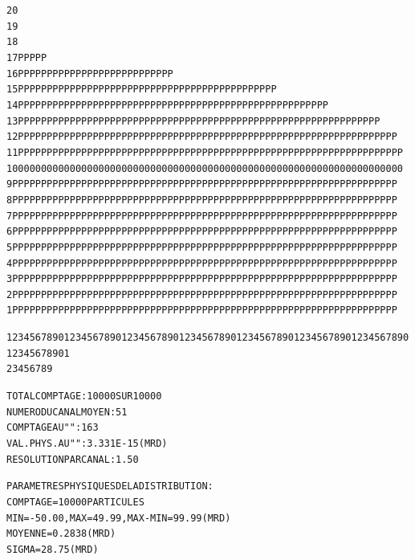 \begin{tiny}
\begin{center}
\begin{alltt}
   20                                                                                                
   19                                                                                        
   18                                                                                        
   17                                       PP       P   P P                                 
   16                P P P   PP             PPPPP   PPPP PPPP  PPP          PPPP P P         
   15               PPPP PPP PPP    PP   P  PPPPPP PPPPPPPPPPP PPPP PP  P  PPPPPPP P         
   14               PPPP PPP PPPP   PP PPPPPPPPPPP PPPPPPPPPPPPPPPP PPP PP PPPPPPPPP         
   13               PPPP PPPPPPPPPPPPPPPPPPPPPPPPPPPPPPPPPPPPPPPPPPPPPP PPPPPPPPPPPPP        
   12               PPPPPPPPPPPPPPPPPPPPPPPPPPPPPPPPPPPPPPPPPPPPPPPPPPPPPPPPPPPPPPPPPP       
   11              PPPPPPPPPPPPPPPPPPPPPPPPPPPPPPPPPPPPPPPPPPPPPPPPPPPPPPPPPPPPPPPPPPP       
   10              0000000000000000000000000000000000000000000000000000000000000000000       
    9              PPPPPPPPPPPPPPPPPPPPPPPPPPPPPPPPPPPPPPPPPPPPPPPPPPPPPPPPPPPPPPPPPPP       
    8              PPPPPPPPPPPPPPPPPPPPPPPPPPPPPPPPPPPPPPPPPPPPPPPPPPPPPPPPPPPPPPPPPPP       
    7              PPPPPPPPPPPPPPPPPPPPPPPPPPPPPPPPPPPPPPPPPPPPPPPPPPPPPPPPPPPPPPPPPPP       
    6              PPPPPPPPPPPPPPPPPPPPPPPPPPPPPPPPPPPPPPPPPPPPPPPPPPPPPPPPPPPPPPPPPPP       
    5              PPPPPPPPPPPPPPPPPPPPPPPPPPPPPPPPPPPPPPPPPPPPPPPPPPPPPPPPPPPPPPPPPPP       
    4              PPPPPPPPPPPPPPPPPPPPPPPPPPPPPPPPPPPPPPPPPPPPPPPPPPPPPPPPPPPPPPPPPPP       
    3              PPPPPPPPPPPPPPPPPPPPPPPPPPPPPPPPPPPPPPPPPPPPPPPPPPPPPPPPPPPPPPPPPPP       
    2              PPPPPPPPPPPPPPPPPPPPPPPPPPPPPPPPPPPPPPPPPPPPPPPPPPPPPPPPPPPPPPPPPPP       
    1              PPPPPPPPPPPPPPPPPPPPPPPPPPPPPPPPPPPPPPPPPPPPPPPPPPPPPPPPPPPPPPPPPPP       
               
            123456789012345678901234567890123456789012345678901234567890123456789012345678901
                     2         3         4         5         6         7         8         9

               
        TOTAL  COMPTAGE                 :   10000  SUR  10000
        NUMERO   DU  CANAL  MOYEN       :      51
        COMPTAGE  AU   "      "         :     163
        VAL. PHYS. AU  "      "         :  3.331E-15 (MRD)
        RESOLUTION  PAR  CANAL          :   1.50   
       
        PARAMETRES  PHYSIQUES  DE  LA  DISTRIBUTION :
                      COMPTAGE =  10000  PARTICULES
                      MIN =  -50.00    , MAX =   49.99    , MAX-MIN =   99.99     (MRD)
                      MOYENNE =  0.2838     (MRD)
                      SIGMA =   28.75     (MRD)


\end{alltt}
\end{center}
\end{tiny}
